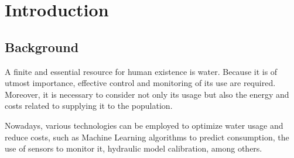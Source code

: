 \chapter{Introduction}%


\section{Background}

\begin{comment}

Um recurso finito e essencial para existência humana é a água. Por tratar-se de um item de extrema importância, é necessário que haja um controle e monitoramento eficaz de seu uso. Mas não só do seu uso mas da energia e custos relacionados ao seu fornecimento à população.

Hoje temos acesso a diversas tecnologias que podem ser utilizadas para otimizar o uso da água e reduzir custos, como por exemplo, algoritmos de Machine Learning para prever o consumo de água, a utilização de sensores para monitorar o consumo, a calibração dos modelos hidráulicos, entre outros.

Nos WSS (Water Supply Systems), a otimização de custos é um desafio, pois é necessário considerar diversos fatores, como a topologia da rede, a demanda de água, a localização dos reservatórios. Outra dificuldade está na consideração da incerteza dos dados devido a muitos casos, os dados coletados são imprecisos ou incompletos.

No campo computacional, a complexidade de cálculos ou a falta de dados gerados na fonte não são grandes desafios como eram a alguns anos atrás. Com a IoT (Internet of Things) e a computação em nuvem, é possível coletar e processar uma grande quantidade de dados em tempo real. Esta quantidade de dados (Big Data) pode ser utilizada para treinar algoritmos de Machine Learning e otimizar custos em WSS. 

Diante destes desafios, a tecnologia é uma aliada nestes vários aspectos a serem tratados. 


\end{comment}

A finite and essential resource for human existence is water. Because it is of utmost importance, effective control and monitoring of its use are required. Moreover, it is necessary to consider not only its usage but also the energy and costs related to supplying it to the population.

Nowadays, various technologies can be employed to optimize water usage and reduce costs, such as Machine Learning algorithms to predict consumption, the use of sensors to monitor it, hydraulic model calibration, among others.


